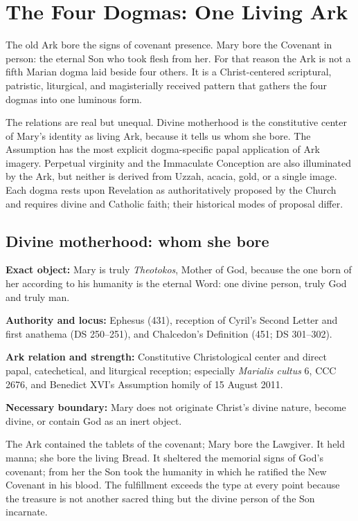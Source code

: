 \section{The Four Dogmas: One Living Ark}

The old Ark bore the signs of covenant presence.  Mary bore the Covenant in
person: the eternal Son who took flesh from her.  For that reason the Ark is
not a fifth Marian dogma laid beside four others.  It is a Christ-centered
scriptural, patristic, liturgical, and magisterially received pattern that
gathers the four dogmas into one luminous form.

The relations are real but unequal.  Divine motherhood is the constitutive
center of Mary's identity as living Ark, because it tells us whom she bore.
The Assumption has the most explicit dogma-specific papal application of Ark
imagery.  Perpetual virginity and the Immaculate Conception are also illuminated
by the Ark, but neither is derived from Uzzah, acacia, gold, or a single image.
Each dogma rests upon Revelation as authoritatively proposed by the Church and
requires divine and Catholic faith; their historical modes of proposal differ.

\subsection{Divine motherhood: whom she bore}

\begin{studyframe}
\textbf{Exact object:} Mary is truly \emph{Theotokos}, Mother of God, because
the one born of her according to his humanity is the eternal Word: one divine
person, truly God and truly man.\par
\textbf{Authority and locus:} Ephesus (431), reception of Cyril's Second
Letter and first anathema (DS 250--251), and Chalcedon's Definition (451;
DS 301--302).\par
\textbf{Ark relation and strength:} Constitutive Christological center and
direct papal, catechetical, and liturgical reception; especially
\emph{Marialis cultus} 6, CCC 2676, and Benedict XVI's Assumption homily of
15 August 2011.\par
\textbf{Necessary boundary:} Mary does not originate Christ's divine nature,
become divine, or contain God as an inert object.
\end{studyframe}

The Ark contained the tablets of the covenant; Mary bore the Lawgiver.  It
held manna; she bore the living Bread.  It sheltered the memorial signs of
God's covenant; from her the Son took the humanity in which he ratified the New
Covenant in his blood.  The fulfillment exceeds the type at every point
because the treasure is not another sacred thing but the divine person of the
Son incarnate.


